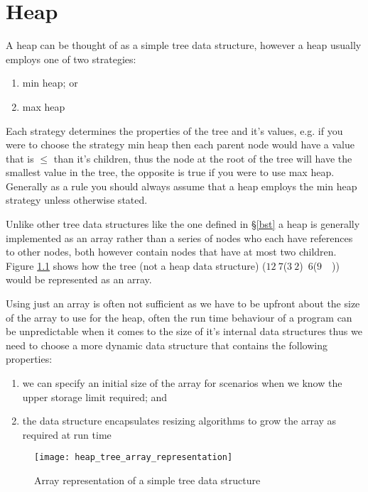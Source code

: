 \chapter{Heap} \label{heap}
A heap can be thought of as a simple tree data structure, however a heap usually employs one of two strategies:

\begin{enumerate}
\item min heap; or
\item max heap
\end{enumerate}

Each strategy determines the properties of the tree and it's values, e.g. if you were to choose the strategy min heap then each parent node would have a value that is $\leq$ than it's children, thus the node at the root of the tree will have the smallest value in the tree, the opposite is true if you were to use max heap. Generally as a rule you should always assume that a heap employs the min heap strategy unless otherwise stated.

Unlike other tree data structures like the one defined in \S\ref{bst} a heap is generally implemented as an array rather than a series of nodes who each have references to other nodes, both however contain nodes that have at most two children. Figure \ref{fig:tree_array_representation} shows how the tree (not a heap data structure) ($12~7$($3~2$)~$6$($9$~~)) would be represented as an array.

Using just an array is often not sufficient as we have to be upfront about the size of the array to use for the heap, often the run time behaviour of a program can be unpredictable when it comes to the size of it's internal data structures thus we need to choose a more dynamic data structure that contains the following properties:

\begin{enumerate}
\item we can specify an initial size of the array for scenarios when we know the upper storage limit required; and
\item the data structure encapsulates resizing algorithms to grow the array as required at run time
\end{enumerate}

\begin{figure}
\begin{center}
\texttt{[image: heap\_tree\_array\_representation]}
\end{center}
\caption{Array representation of a simple tree data structure} \label{fig:tree_array_representation}
\end{figure}

